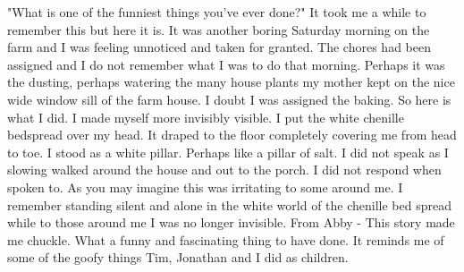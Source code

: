 
"What is one of the funniest things you've ever done?"
It took me a while to remember this but here it is.
It was another boring Saturday morning on the farm and I was feeling unnoticed and taken for granted. The chores had been assigned and I do not remember what I was to do that morning. Perhaps it was the dusting, perhaps watering the many house plants my mother kept on the nice wide window sill of the farm house. I doubt I was assigned the baking. So here is what I did. I made myself more invisibly visible. I put the white chenille bedspread over my head. It draped to the floor completely covering me from head to toe. I stood as a white pillar. Perhaps like a pillar of salt. I did not speak as I slowing walked around the house and out to the porch. I did not respond when spoken to. As you may imagine this was irritating to some around me. I remember standing silent and alone in the white world of the chenille bed spread while to those around me I was no longer invisible.
From Abby - This story made me chuckle. What a funny and fascinating thing to have done. It reminds me of some of the goofy things Tim, Jonathan and I did as children.




